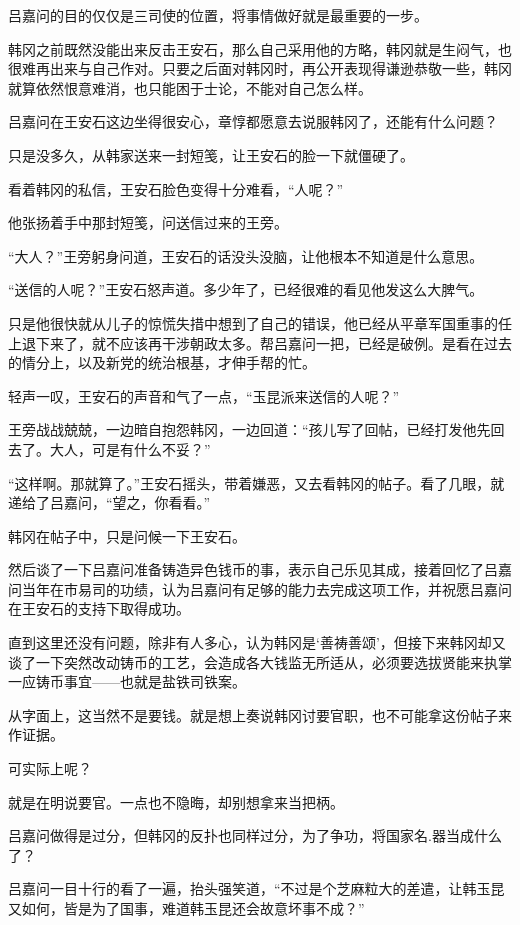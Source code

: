 吕嘉问的目的仅仅是三司使的位置，将事情做好就是最重要的一步。

韩冈之前既然没能出来反击王安石，那么自己采用他的方略，韩冈就是生闷气，也很难再出来与自己作对。只要之后面对韩冈时，再公开表现得谦逊恭敬一些，韩冈就算依然恨意难消，也只能困于士论，不能对自己怎么样。

吕嘉问在王安石这边坐得很安心，章惇都愿意去说服韩冈了，还能有什么问题？

只是没多久，从韩家送来一封短笺，让王安石的脸一下就僵硬了。

看着韩冈的私信，王安石脸色变得十分难看，“人呢？”

他张扬着手中那封短笺，问送信过来的王旁。

“大人？”王旁躬身问道，王安石的话没头没脑，让他根本不知道是什么意思。

“送信的人呢？”王安石怒声道。多少年了，已经很难的看见他发这么大脾气。

只是他很快就从儿子的惊慌失措中想到了自己的错误，他已经从平章军国重事的任上退下来了，就不应该再干涉朝政太多。帮吕嘉问一把，已经是破例。是看在过去的情分上，以及新党的统治根基，才伸手帮的忙。

轻声一叹，王安石的声音和气了一点，“玉昆派来送信的人呢？”

王旁战战兢兢，一边暗自抱怨韩冈，一边回道：“孩儿写了回帖，已经打发他先回去了。大人，可是有什么不妥？”

“这样啊。那就算了。”王安石摇头，带着嫌恶，又去看韩冈的帖子。看了几眼，就递给了吕嘉问，“望之，你看看。”

韩冈在帖子中，只是问候一下王安石。

然后谈了一下吕嘉问准备铸造异色钱币的事，表示自己乐见其成，接着回忆了吕嘉问当年在市易司的功绩，认为吕嘉问有足够的能力去完成这项工作，并祝愿吕嘉问在王安石的支持下取得成功。

直到这里还没有问题，除非有人多心，认为韩冈是‘善祷善颂’，但接下来韩冈却又谈了一下突然改动铸币的工艺，会造成各大钱监无所适从，必须要选拔贤能来执掌一应铸币事宜——也就是盐铁司铁案。

从字面上，这当然不是要钱。就是想上奏说韩冈讨要官职，也不可能拿这份帖子来作证据。

可实际上呢？

就是在明说要官。一点也不隐晦，却别想拿来当把柄。

吕嘉问做得是过分，但韩冈的反扑也同样过分，为了争功，将国家名.器当成什么了？

吕嘉问一目十行的看了一遍，抬头强笑道，“不过是个芝麻粒大的差遣，让韩玉昆又如何，皆是为了国事，难道韩玉昆还会故意坏事不成？”

